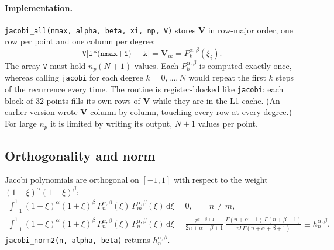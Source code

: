 \documentclass[11pt,a4paper]{article}
\newcommand{\Pab}[1]{P_{#1}^{\alpha,\beta}}     %
\newcommand{\dd}{\mathrm{d}}
\newcommand{\code}[1]{\texttt{#1}}
\begin{document}
\paragraph{Implementation.}
\code{jacobi\_all(nmax, alpha, beta, xi, np, V)} stores $\mathbf{V}$ in
row-major order, one row per point and one column per degree:
\begin{equation*}
  \code{V[i*(nmax+1) + k]} = \mathbf{V}_{ik} = \Pab{k}(\xi_i).
\end{equation*}
The array \code{V} must hold $n_p(N+1)$ values. Each $\Pab{k}$ is computed
exactly once, whereas calling \code{jacobi} for each degree
$k=0,\dots,N$ would repeat the first $k$ steps of the recurrence every time.
The routine is register-blocked like \code{jacobi}: each block of 32 points
fills its own rows of $\mathbf{V}$ while they are in the L1 cache. (An earlier
version wrote $\mathbf{V}$ column by column, touching every row at every
degree.) For large $n_p$ it is limited by writing its output, $N+1$ values per
point.

\subsection{Orthogonality and norm}
\label{sec:norm}

Jacobi polynomials are orthogonal on $[-1,1]$ with respect to the weight
$(1-\xi)^\alpha(1+\xi)^\beta$:
\begin{equation}
\begin{gathered}
  \int_{-1}^{1}(1-\xi)^\alpha(1+\xi)^\beta\,\Pab{n}(\xi)\,\Pab{m}(\xi)\,\dd\xi = 0,
  \qquad n\neq m,\\[0.4em]
  \int_{-1}^{1}(1-\xi)^\alpha(1+\xi)^\beta\,\Pab{n}(\xi)\,\Pab{n}(\xi)\,\dd\xi
  = \frac{2^{\alpha+\beta+1}}{2n+\alpha+\beta+1}\,
    \frac{\Gamma(n+\alpha+1)\,\Gamma(n+\beta+1)}{n!\,\Gamma(n+\alpha+\beta+1)}
  \equiv h_n^{\alpha,\beta}.
\end{gathered}
\tag{A.1.7}
\end{equation}
\code{jacobi\_norm2(n, alpha, beta)} returns $h_n^{\alpha,\beta}$.
\end{document}
